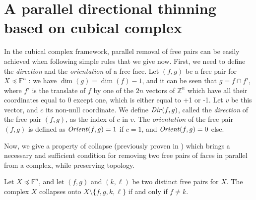\documentclass[final,envcountsame]{llncs}
\def\myem#1{{\em #1}}
\def\Zset{\Z}
\def\Z{\mathbb{Z}}
\def\allfaces#1{\mathbb{F}^{#1}}
\def\subcomplex#1#2{#1 \preceq #2}
\def\complex#1#2{\subcomplex{#2}{\allfaces{#1}}}
\def\mydim#1{\dim(#1)}
\def\type#1{\mbox{\it{}Dir\/}(#1)}
\def\orient#1{\mbox{\it{}Orient\/}(#1)}
\def\inter{\cap}
\def\finproof{\square}
\begin{document}
\section{A parallel directional thinning based on cubical complex}
\label{sec::skeletonization}

In the cubical complex framework, parallel removal of free pairs can be easily achieved when following simple rules that we give now. First, we need to define the \myem{direction} and the \myem{orientation} of a free face.
Let $(f,g)$ be a free pair for $\complex{n}{X}$ : we have $\mydim{g} = \mydim{f}-1$, and it can be seen that $g = f \inter f'$, where $f'$ is the translate of $f$ by one of the $2n$ vectors of $\Zset^n$ which have all their coordinates equal to 0 except one, which is either equal to +1 or -1. Let $v$ be this vector, and $c$ its non-null coordinate. We define $\type{f,g}$, called the \myem{direction} of the free pair $(f,g)$, as the index of $c$ in $v$. The \myem{orientation} of the free pair $(f,g)$ is defined as $\orient{f,g}=1$ if $c=1$, and $\orient{f,g}=0$ else.


Now, we give a property of collapse (previously proven in \cite{ChauCou2009}) which brings a necessary and sufficient condition for removing two free pairs of faces in parallel from a complex, while preserving topology.

\begin{proposition}
\label{prop:collpar2}
Let $\complex{n}{X}$, and let $(f,g)$ and $(k,\ell)$ be two distinct free pairs for $X$. The complex $X$ collapses onto $X \setminus \{f,g,k,\ell\}$ if and only if $f \neq k$. 
\end{proposition}

\end{document}
